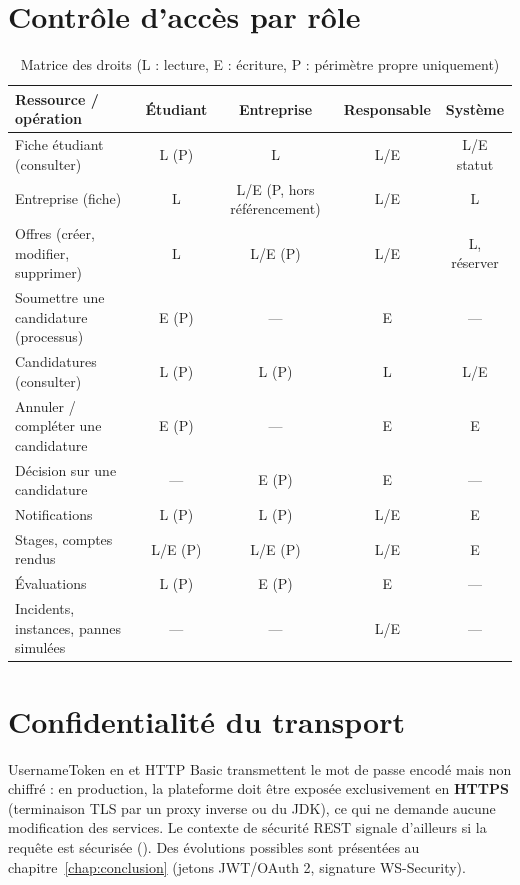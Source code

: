 \section{Contrôle d'accès par rôle}
\begin{table}[htbp]
\centering\small
\caption{Matrice des droits (L : lecture, E : écriture, P : périmètre propre uniquement)}
\begin{tabularx}{\textwidth}{@{}Ycccc@{}}
\toprule
\textbf{Ressource / opération} & \textbf{Étudiant} & \textbf{Entreprise} & \textbf{Responsable} & \textbf{Système} \\
\midrule
Fiche étudiant (consulter) & L (P) & L & L/E & L/E statut \\
Entreprise (fiche) & L & L/E (P, hors référencement) & L/E & L \\
Offres (créer, modifier, supprimer) & L & L/E (P) & L/E & L, réserver \\
Soumettre une candidature (processus) & E (P) & — & E & — \\
Candidatures (consulter) & L (P) & L (P) & L & L/E \\
Annuler / compléter une candidature & E (P) & — & E & E \\
Décision sur une candidature & — & E (P) & E & — \\
Notifications & L (P) & L (P) & L/E & E \\
Stages, comptes rendus & L/E (P) & L/E (P) & L/E & E \\
Évaluations & L (P) & E (P) & E & — \\
Incidents, instances, pannes simulées & — & — & L/E & — \\
\bottomrule
\end{tabularx}
\end{table}

\section{Confidentialité du transport}
UsernameToken en  et HTTP Basic transmettent le mot de passe encodé mais non chiffré : en
production, la plateforme doit être exposée exclusivement en \textbf{HTTPS} (terminaison TLS par un proxy inverse ou
 du JDK), ce qui ne demande aucune modification des services. Le contexte de sécurité REST signale
d'ailleurs si la requête est sécurisée (). Des évolutions possibles sont présentées au
chapitre~\ref{chap:conclusion} (jetons JWT/OAuth 2, signature WS-Security).

